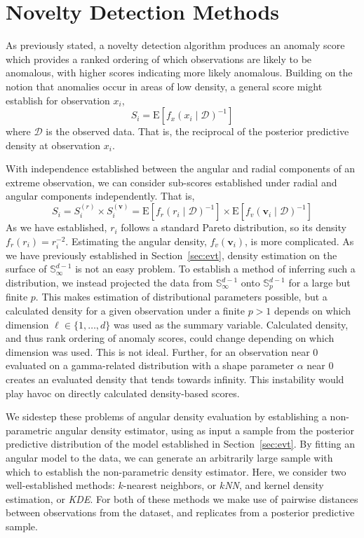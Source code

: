 \section{Novelty Detection Methods\label{sec:novelty}}
As previously stated, a novelty detection algorithm produces an anomaly score 
    which provides a ranked ordering of which observations are likely to be 
    anomalous, with higher scores indicating more likely anomalous. Building on 
    the notion that anomalies occur in areas of low density, a general score 
    might establish for observation $x_i$, 
    \[S_i = \text{E}\left[f_{x}(x_i\mid\mathcal{D})^{-1}\right]\]
    where $\mathcal{D}$ is the observed data.  That is, the reciprocal of the 
    posterior predictive density at observation $x_i$.

With independence established between the angular and radial components of an
    extreme observation, we can consider sub-scores established under radial 
    and angular components independently.  That is,
    \[
        S_i = S_i^{(r)}\times S_i^{(\bm{v})} = 
            \text{E}\left[f_r(r_i\mid\mathcal{D})^{-1}\right]\times
            \text{E}\left[f_v(\bm{v}_i\mid\mathcal{D})^{-1}\right]
    \]
    As we have established, $r_i$ follows a standard Pareto distribution, so its
    density $f_r(r_i) = r_i^{-2}$.  Estimating the angular density, 
    $f_v(\bm{v}_i)$, is more complicated.  As we have previously established in
    Section~\ref{sec:evt}, density estimation on the surface of 
    ${\mathbb S}_{\infty}^{d-1}$ is not an easy problem. To establish a method
    of inferring such a distribution, we instead projected the data from 
    $\mathbb{S}_{\infty}^{d-1}$ onto $\mathbb{S}_p^{d-1}$ for a large but finite
    $p$.  This makes estimation of distributional parameters possible, but a
    calculated density for a given observation under a finite $p > 1$ depends on
    which dimension $\ell \in \lbrace 1,\ldots,d\rbrace$ was used as the summary
    variable.  Calculated density, and thus rank ordering of anomaly scores,
    could change depending on which dimension was used.  This is not ideal.
    Further, for an observation near 0 evaluated on a gamma-related distribution 
    with a shape parameter $\alpha$ near 0 creates an evaluated density that 
    tends towards infinity.  This instability would play havoc on directly 
    calculated density-based scores.

We sidestep these problems of angular density evaluation by establishing a 
    non-parametric angular density estimator, using as input a sample from the 
    posterior predictive distribution of the model established in 
    Section~\ref{sec:evt}. By fitting an angular model to the data, we can 
    generate an arbitrarily large sample with which to establish the 
    non-parametric density estimator.  Here, we consider two well-established
    methods: $k$-nearest neighbors, or \emph{$k$NN}, and 
    kernel density estimation, or \emph{KDE}.  For both of these methods we make
    use of pairwise distances between observations from the dataset, and
    replicates from a posterior predictive sample.  


